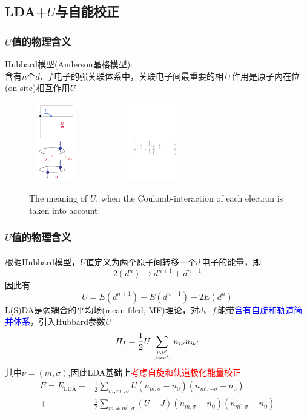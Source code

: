 \documentclass[cjk,slidestop,compress,mathserif,blue]{beamer}
\newcommand{\upcite}[1]{\hspace{0ex}\textsuperscript{\cite{#1}}} %
\begin{document}
\subsection{\rm{LDA+}$U$与自能校正}
\frame
{
\frametitle{$U$值的物理含义}
\textrm{Hubbard}模型(\textrm{Anderson晶格模型}):\\含有$n$个$d$、$f$\,电子的强关联体系中，关联电子间最重要的相互作用是原子内在位(\textrm{on-site})相互作用$U$
\begin{figure}[h!]
\centering
\includegraphics[height=1.35in,width=0.92in,viewport=1 1 240 375,clip]{Figures/LDA_U-1.png}
\includegraphics[height=1.35in,width=2.32in,viewport=110 210 545 455,clip]{Figures/LDA_U.pdf}
\caption{\tiny \textrm{The meaning of $U$, when the Coulomb-interaction of each electron is taken into account.}}%
\label{Tetrahedron_weight}
\end{figure}
}

\frame
{
\frametitle{$U$值的物理含义}
根据\textrm{Hubbard}模型，\textrm{$U$}值定义为两个原子间转移一个$d$\,电子的能量，即\upcite{PRB44-943_1991}
$$2(d^n)\rightarrow d^{n+1}+d^{n-1}$$
因此有
$$U=E(d^{n+1})+E(d^{n-1})-2E(d^n)$$
\textrm{L(S)DA}是弱耦合的平均场(\textrm{mean-filed, MF})理论，对$d$、$f$\,能带\textcolor{blue}{含有自旋和轨道简并体系}，引入\textrm{Hubbard}参数$U$
\begin{displaymath}
	H_I=\frac12U\sum\limits_{\nu,\nu^{\prime}\atop(\nu\neq\nu^{\prime})}n_{i\nu}n_{i\nu^{\prime}}
\end{displaymath}
其中$\nu=(m,\sigma)$,因此\textrm{LDA}基础上\textcolor{red}{考虑自旋和轨道极化能量校正}
\begin{displaymath}
	\begin{aligned}
		E=E_{\mathrm{LDA}}+&\frac12\sum_{m,m^{\prime},\sigma}U(n_{m,\sigma}-n_0)(n_{m^{\prime},-\sigma}-n_0)\\
		+&\frac12\sum_{m\neq m^{\prime},\sigma}(U-J)(n_{m,\sigma}-n_0)(n_{m^{\prime},\sigma}-n_0)
	\end{aligned}
\end{displaymath}
}
\end{document}
